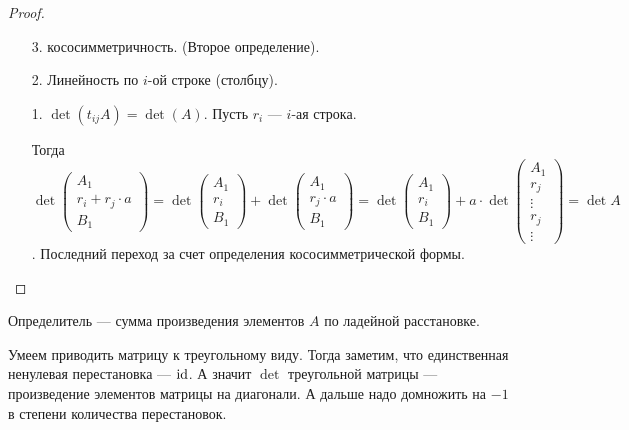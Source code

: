 \begin{proof}
    \begin{enumerate}
        \item[3.] кососимметричность. (Второе определение).
        \item[2.] Линейность по $i$-ой строке (столбцу).
        \item[1.]  $\det(t_{ij}A) = \det(A)$.  Пусть $r_i$ ---  $i$-ая строка.

            Тогда  $\det \left( \begin{array}{c} A_1 \\\hline r_i + r_j \cdot a \\\hline B_1 \end{array}\right) = \det \left( \begin{array}{c} A_1 \\\hline r_i \\\hline B_1 \end{array}\right) + \det \left( \begin{array}{c} A_1 \\\hline r_j \cdot a \\\hline B_1 \end{array}\right) = \det \left( \begin{array}{c} A_1 \\\hline r_i\\\hline B_1 \end{array}\right) + a \cdot \det \left( \begin{array}{c} A_1 \\\hline r_j\\\hline \vdots \\ r_j \\\hline \vdots \end{array}\right) = \det A$. Последний переход за счет определения кососимметрической формы.
    \end{enumerate}
\end{proof}
\begin{remark}
    Определитель --- сумма произведения элементов $A$ по ладейной расстановке.
\end{remark}

Умеем приводить матрицу к треугольному виду. Тогда заметим, что единственная ненулевая перестановка --- $\operatorname{id}$. А значит  $\det$ треугольной матрицы --- произведение элементов матрицы на диагонали. А дальше надо домножить на  $-1$ в степени количества перестановок. 


